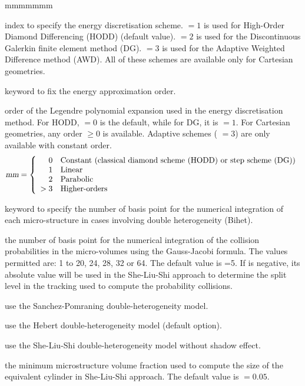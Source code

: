 \begin{ListeDeDescription}{mmmmmmm}
\item[\dusa{eschm}] index to specify the energy discretisation scheme.  $=1$ is used for High-Order Diamond Differencing (HODD) (default value).  $=2$ is used for the Discontinuous Galerkin finite element method (DG).  $=3$ is used for the Adaptive Weighted Difference method (AWD). All of these schemes are available only for Cartesian geometries.

\item[\moc{EDIAM}] keyword to fix the energy approximation order.

\item[\dusa{emm}] order of the Legendre polynomial expansion used in the energy discretisation method. For HODD,  $=0$ is the default, while for DG, it is  $=1$.
For Cartesian geometries, any order  $\geq0$ is available. Adaptive schemes ( $=3$) are only available with constant order.
\begin{displaymath}
\dusa{mm} = \left\{
\begin{array}{rl}
 0 & \textrm{Constant (classical diamond scheme (HODD) or step scheme (DG))} \\
 1 & \textrm{Linear} \\
 2 & \textrm{Parabolic} \\
 >3  & \textrm{Higher-orders}
\end{array} \right.
\end{displaymath}

\item[\moc{QUAB}] keyword to specify the number of basis point for the
numerical integration of each micro-structure in cases involving double
heterogeneity (Bihet).

\item[\dusa{iquab}] the number of basis point for the numerical integration of
the collision probabilities in the micro-volumes using the  Gauss-Jacobi
formula. The values permitted are: 1 to 20, 24, 28, 32 or  64. The default value
is =5. If  is negative, its absolute value will be used in the She-Liu-Shi approach to determine the
split level in the tracking used to compute the probability collisions.

\item[\moc{SAPO}] use the Sanchez-Pomraning double-heterogeneity model.\cite{sapo}

\item[\moc{HEBE}] use the Hebert double-heterogeneity model (default option).\cite{BIHET}

\item[\moc{SLSI}] use the She-Liu-Shi double-heterogeneity model without shadow effect.\cite{She2017}

\item[\dusa{frtm}] the minimum microstructure volume fraction used to compute the size of the equivalent cylinder in She-Liu-Shi approach. The default value is  $=0.05$.

\end{ListeDeDescription}

\eject
